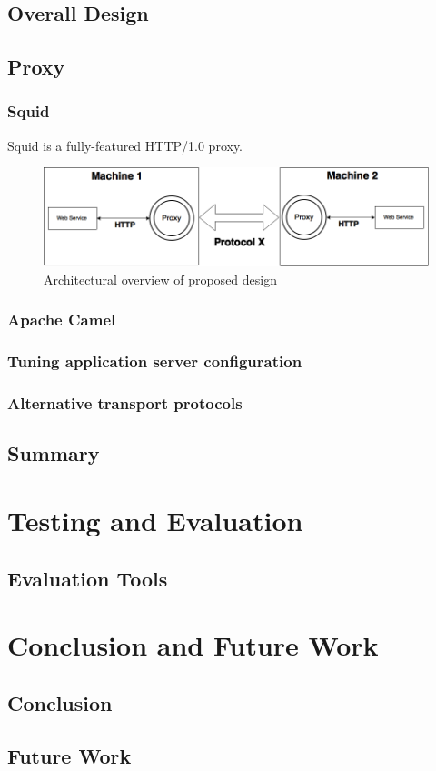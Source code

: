 \documentclass[USenglish]{ifimaster}
\begin{document}
\section{Overall Design}
\section{Proxy}
\subsection{Squid}
Squid is a fully-featured HTTP/1.0 proxy.
\begin{figure}[h]
\includegraphics[scale=0.4]{images/architecture.png}
\caption{Architectural overview of proposed design}
\end{figure}

\subsection{Apache Camel}

\subsection{Tuning application server configuration}

\subsection{Alternative transport protocols}

\section{Summary}

\chapter{Testing and Evaluation}
\section{Evaluation Tools}

\chapter{Conclusion and Future Work}
\section{Conclusion}

\section{Future Work}

\pagebreak
\printbibliography{}
\printglossaries
\end{document}
